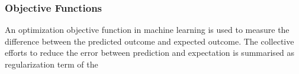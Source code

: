 \subsubsection{Objective Functions}
An optimization objective function in machine learning is used to measure the difference between the predicted outcome and expected outcome. The collective efforts to reduce the error between prediction and expectation is summarised as regularization term of the